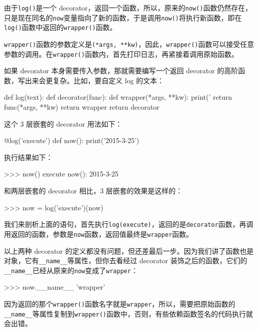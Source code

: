 由于\texttt{log()}是一个
decorator，返回一个函数，所以，原来的\texttt{now()}函数仍然存在，只是现在同名的\texttt{now}变量指向了新的函数，于是调用\texttt{now()}将执行新函数，即在\texttt{log()}函数中返回的\texttt{wrapper()}函数。

\texttt{wrapper()}函数的参数定义是\texttt{(*args,\ **kw)}，因此，\texttt{wrapper()}函数可以接受任意参数的调用。在\texttt{wrapper()}函数内，首先打印日志，再紧接着调用原始函数。

如果 decorator 本身需要传入参数，那就需要编写一个返回 decorator
的高阶函数，写出来会更复杂。比如，要自定义 log 的文本：

\begin{pythoncode}
def log(text):
    def decorator(func):
        def wrapper(*args, **kw):
            print('%
            return func(*args, **kw)
        return wrapper
    return decorator
\end{pythoncode}

这个 3 层嵌套的 decorator 用法如下：

\begin{pythoncode}
@log('execute')
def now():
    print('2015-3-25')
\end{pythoncode}

执行结果如下：

\begin{pythoncode}
>>> now()
execute now():
2015-3-25
\end{pythoncode}

和两层嵌套的 decorator 相比，3 层嵌套的效果是这样的：

\begin{pythoncode}
>>> now = log('execute')(now)
\end{pythoncode}

我们来剖析上面的语句，首先执行\texttt{log(\textquotesingle{}execute\textquotesingle{})}，返回的是\texttt{decorator}函数，再调用返回的函数，参数是\texttt{now}函数，返回值最终是\texttt{wrapper}函数。

以上两种 decorator
的定义都没有问题，但还差最后一步。因为我们讲了函数也是对象，它有\texttt{\_\_name\_\_}等属性，但你去看经过
decorator
装饰之后的函数，它们的\texttt{\_\_name\_\_}已经从原来的\texttt{\textquotesingle{}now\textquotesingle{}}变成了\texttt{\textquotesingle{}wrapper\textquotesingle{}}：

\begin{pythoncode}
>>> now.__name__
'wrapper'
\end{pythoncode}

因为返回的那个\texttt{wrapper()}函数名字就是\texttt{\textquotesingle{}wrapper\textquotesingle{}}，所以，需要把原始函数的\texttt{\_\_name\_\_}等属性复制到\texttt{wrapper()}函数中，否则，有些依赖函数签名的代码执行就会出错。

